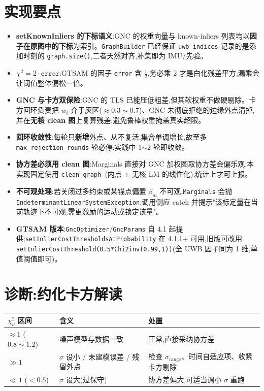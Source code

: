 \documentclass[11pt,a4paper]{report}
\begin{document}
\section{实现要点}
\begin{itemize}[leftmargin=2em]
  \item \textbf{setKnownInliers 的下标语义}:GNC 的权重向量与 known-inliers 列表均以\textbf{因子在原图中的下标}为索引。\texttt{GraphBuilder} 已经保证 \texttt{uwb\_indices} 记录的是添加时刻的 \texttt{graph.size()},二者天然对齐,补集即为 IMU/先验。
  \item \textbf{$\chi^2=2\cdot\texttt{error}$}:GTSAM 的因子 \texttt{error} 含 $\tfrac12$,务必乘 2 才是白化残差平方;漏乘会让阈值整体偏松一倍。
  \item \textbf{GNC 与卡方双保险}:GNC 的 TLS 已能压低粗差,但其软权重不做硬剔除。卡方回环负责把 $w_i$ 介于灰区($\approx0.3\!\sim\!0.7$)、GNC 未彻底拒绝的边缘外点清掉,并在\textbf{无核 clean 图}上复算残差,避免鲁棒权重掩盖真实超限。
  \item \textbf{回环收敛性}:每轮只\textbf{新增}外点、从不复活,集合单调增长,故至多 \texttt{max\_rejection\_rounds} 轮必停;实践中 1$\sim$2 轮即收敛。
  \item \textbf{协方差必须用 clean 图}:Marginals 直接对 GNC 加权图取协方差会偏乐观;本实现固定使用 \texttt{clean\_graph\_}(内点 + 无核 LM 的线性化),统计上才可上报。
  \item \textbf{不可观处理}:若关闭过多约束或某锚点偏置 $\beta_m$ 不可观,\texttt{Marginals} 会抛 \texttt{IndeterminantLinearSystemException};调用侧应 catch 并提示"该标定量在当前轨迹下不可观,需更激励的运动或锁定该量"。
  \item \textbf{GTSAM 版本}:\texttt{GncOptimizer}/\texttt{GncParams} 自 4.1 起提供;\texttt{setInlierCostThresholdsAtProbability} 在 4.1.1+ 可用,旧版可改用 \texttt{setInlierCostThreshold(0.5*Chi2inv(0.99,1))}(全 UWB 因子同为 1 维,单值阈值即可)。
\end{itemize}

\section{诊断:约化卡方解读}
\begin{longtable}{l p{4.0cm} p{6.2cm}}
\toprule
$\chi^2_\nu$ 区间 & 含义 & 处置 \\
\midrule
$\approx 1$ ($0.8\!\sim\!1.2$) & 噪声模型与数据一致 & 正常,直接采纳协方差 \\
$\gg 1$ & $\sigma$ 设小 / 未建模误差 / 残留外点 & 检查 $\sigma_{\text{range}}$、时间自适应项、收紧卡方剔除 \\
$\ll 1$ ($<0.5$) & $\sigma$ 设大(过保守) & 协方差偏大,可适当调小 $\sigma$ 重跑 \\
\bottomrule
\end{longtable}
\end{document}
